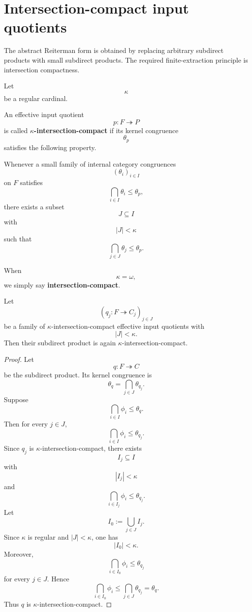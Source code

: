 \section{Intersection-compact input quotients}
\label{sec:reiterman-intersection-compact-input-quotients}

The abstract Reiterman form is obtained by replacing arbitrary subdirect
products with small subdirect products. The required finite-extraction
principle is intersection compactness.

Let
\[
\kappa
\]
be a regular cardinal.

\begin{definition}
\label{def:reiterman-kappa-intersection-compact-quotient}
An effective input quotient
\[
p:F\twoheadrightarrow P
\]
is called \textbf{\(\kappa\)-intersection-compact} if its kernel congruence
\[
\theta_p
\]
satisfies the following property.

Whenever a small family of internal category congruences
\[
(\theta_i)_{i\in I}
\]
on \(F\) satisfies
\[
\bigcap_{i\in I}\theta_i\leq\theta_p,
\]
there exists a subset
\[
J\subseteq I
\]
with
\[
|J|<\kappa
\]
such that
\[
\bigcap_{j\in J}\theta_j\leq\theta_p.
\]
\end{definition}

When
\[
\kappa=\omega,
\]
we simply say \textbf{intersection-compact}.

\begin{proposition}
\label{prop:reiterman-small-subdirect-products-preserve-compactness}
Let
\[
(q_j:F\twoheadrightarrow C_j)_{j\in J}
\]
be a family of \(\kappa\)-intersection-compact effective input quotients with
\[
|J|<\kappa.
\]
Then their subdirect product is again \(\kappa\)-intersection-compact.
\end{proposition}

\begin{proof}
Let
\[
q:F\twoheadrightarrow C
\]
be the subdirect product. Its kernel congruence is
\[
\theta_q=\bigcap_{j\in J}\theta_{q_j}.
\]
Suppose
\[
\bigcap_{i\in I}\phi_i\leq\theta_q.
\]
Then for every \(j\in J\),
\[
\bigcap_{i\in I}\phi_i\leq\theta_{q_j}.
\]
Since \(q_j\) is \(\kappa\)-intersection-compact, there exists
\[
I_j\subseteq I
\]
with
\[
|I_j|<\kappa
\]
and
\[
\bigcap_{i\in I_j}\phi_i\leq\theta_{q_j}.
\]
Let
\[
I_0:=\bigcup_{j\in J}I_j.
\]
Since \(\kappa\) is regular and \(|J|<\kappa\), one has
\[
|I_0|<\kappa.
\]
Moreover,
\[
\bigcap_{i\in I_0}\phi_i
\leq
\theta_{q_j}
\]
for every \(j\in J\). Hence
\[
\bigcap_{i\in I_0}\phi_i
\leq
\bigcap_{j\in J}\theta_{q_j}
=
\theta_q.
\]
Thus \(q\) is \(\kappa\)-intersection-compact.
\end{proof}

